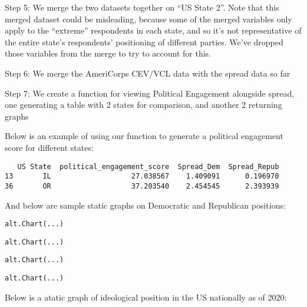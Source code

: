 \documentclass[
  letterpaper,
  DIV=11,
  numbers=noendperiod]{scrartcl}
\begin{document}
Step 5: We merge the two datasets together on ``US State 2''. Note that
this merged dataset could be misleading, because some of the merged
variables only apply to the ``extreme'' respondents in each state, and
so it's not representative of the entire state's respondents'
positioning of different parties. We've dropped those variables from the
merge to try to account for this.

Step 6: We merge the AmeriCorps CEV/VCL data with the spread data so far

Step 7: We create a function for viewing Political Engagement alongside
spread, one generating a table with 2 states for comparison, and another
2 returning graphs

Below is an example of using our function to generate a political
engagement score for different states:

\begin{verbatim}
   US State  political_engagement_score  Spread_Dem  Spread_Repub
13       IL                   27.038567    1.409091      0.196970
36       OR                   37.203540    2.454545      2.393939
\end{verbatim}

And below are sample static graphs on Democratic and Republican
positions:

\begin{verbatim}
alt.Chart(...)
\end{verbatim}

\begin{verbatim}
alt.Chart(...)
\end{verbatim}

\begin{verbatim}
alt.Chart(...)
\end{verbatim}

\begin{verbatim}
alt.Chart(...)
\end{verbatim}

Below is a atatic graph of ideological position in the US nationally as
of 2020:
\end{document}
